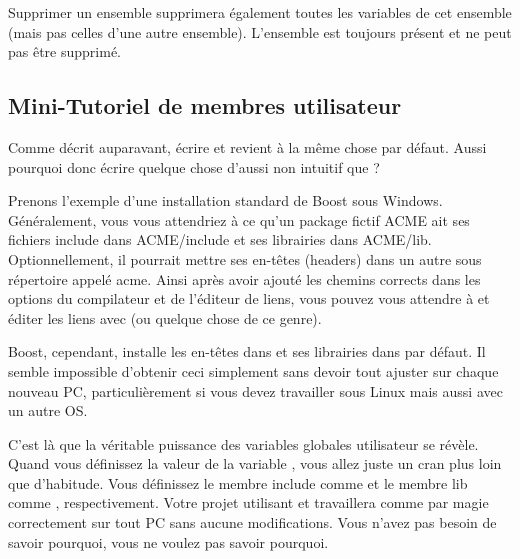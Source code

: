 Supprimer un ensemble supprimera également toutes les variables de cet ensemble (mais pas celles d'une autre ensemble). L'ensemble  est toujours présent et ne peut pas être supprimé.

\subsection{Mini-Tutoriel de membres utilisateur}\label{sec:mini_tutorial}

Comme décrit auparavant, écrire  et  revient à la même chose par défaut. Aussi pourquoi donc écrire quelque chose d'aussi non intuitif que ?

Prenons l'exemple d'une installation standard de Boost sous Windows. Généralement, vous vous attendriez à ce qu'un package fictif ACME ait ses fichiers include dans ACME/include et ses librairies dans ACME/lib. Optionnellement, il pourrait mettre ses en-têtes (headers) dans un autre sous répertoire appelé acme. Ainsi après avoir ajouté les chemins corrects dans les options du compilateur et de l'éditeur de liens, vous pouvez vous attendre à  et éditer les liens avec  (ou quelque chose de ce genre).

Boost, cependant, installe les en-têtes dans  et ses librairies dans  par défaut. Il semble impossible d'obtenir ceci simplement sans devoir tout ajuster sur chaque nouveau PC, particulièrement si vous devez travailler sous Linux mais aussi avec un autre OS.

C'est là que la véritable puissance des variables globales utilisateur se révèle. Quand vous définissez la valeur de la variable , vous allez juste un cran plus loin que d'habitude. Vous définissez le membre include comme  et le membre lib comme , respectivement. Votre projet utilisant  et  travaillera comme par magie correctement sur tout PC sans aucune modifications. Vous n'avez pas besoin de savoir pourquoi, vous ne voulez pas savoir pourquoi.
